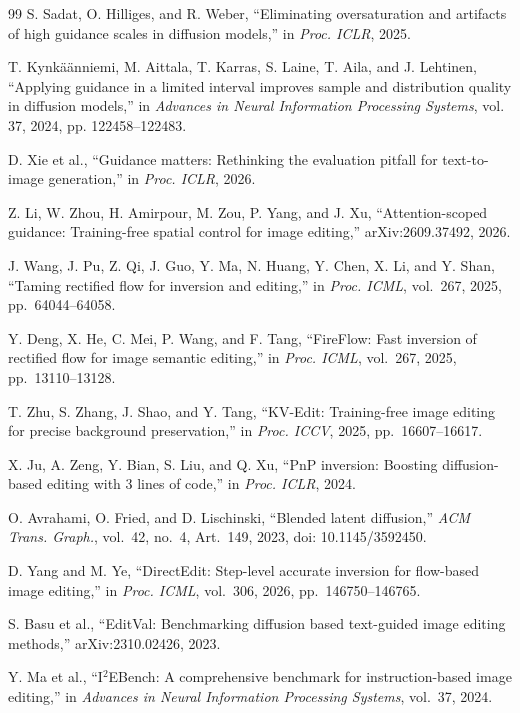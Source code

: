 \begin{thebibliography}{99}
S. Sadat, O. Hilliges, and R. Weber,
``Eliminating oversaturation and artifacts of high guidance scales in diffusion models,''
in \emph{Proc. ICLR}, 2025.

T. Kynk\"{a}\"{a}nniemi, M. Aittala, T. Karras, S. Laine, T. Aila, and J. Lehtinen,
``Applying guidance in a limited interval improves sample and distribution quality in diffusion models,''
in \emph{Advances in Neural Information Processing Systems}, vol. 37, 2024, pp. 122458--122483.

D. Xie et al.,
``Guidance matters: Rethinking the evaluation pitfall for text-to-image generation,'' in \emph{Proc. ICLR}, 2026.

Z. Li, W. Zhou, H. Amirpour, M. Zou, P. Yang, and J. Xu,
``Attention-scoped guidance: Training-free spatial control for image editing,'' arXiv:2609.37492, 2026.

J. Wang, J. Pu, Z. Qi, J. Guo, Y. Ma, N. Huang, Y. Chen, X. Li, and Y. Shan, ``Taming rectified flow for inversion and editing,''
in \emph{Proc. ICML}, vol.~267, 2025, pp.~64044--64058.

Y. Deng, X. He, C. Mei, P. Wang, and F. Tang, ``FireFlow: Fast inversion of rectified flow for image semantic editing,''
in \emph{Proc. ICML}, vol.~267, 2025, pp.~13110--13128.

T. Zhu, S. Zhang, J. Shao, and Y. Tang, ``KV-Edit: Training-free image editing for precise background preservation,''
in \emph{Proc. ICCV}, 2025, pp.~16607--16617.

X. Ju, A. Zeng, Y. Bian, S. Liu, and Q. Xu,
``PnP inversion: Boosting diffusion-based editing with 3 lines of code,'' in \emph{Proc. ICLR}, 2024.

O. Avrahami, O. Fried, and D. Lischinski, ``Blended latent diffusion,''
\emph{ACM Trans. Graph.}, vol.~42, no.~4, Art.~149, 2023, doi: 10.1145/3592450.

D. Yang and M. Ye,
``DirectEdit: Step-level accurate inversion for flow-based image editing,'' in \emph{Proc. ICML}, vol.~306, 2026, pp.~146750--146765.

S. Basu et al.,
``EditVal: Benchmarking diffusion based text-guided image editing methods,'' arXiv:2310.02426, 2023.

Y. Ma et al.,
``I$^{2}$EBench: A comprehensive benchmark for instruction-based image editing,'' in \emph{Advances in Neural Information Processing Systems}, vol.~37, 2024.


\end{thebibliography}
